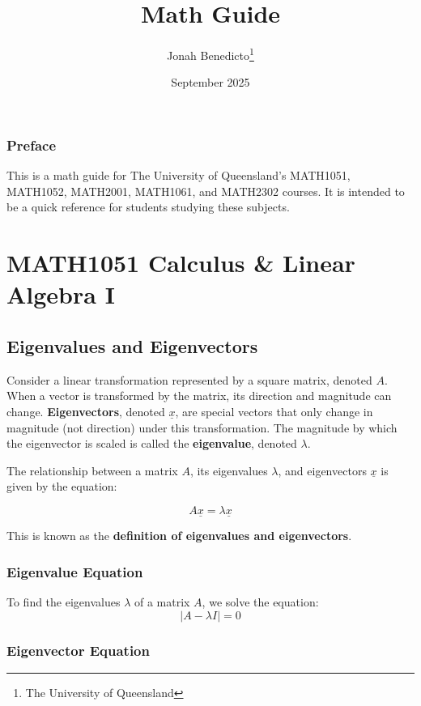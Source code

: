 \documentclass[12pt, letterpaper]{book}
\title{Math Guide}
\author{Jonah Benedicto\thanks{The University of Queensland}}
\date{September 2025}
\begin{document}
\maketitle

\tableofcontents

\newpage

\section*{Preface}
This is a math guide for The University of Queensland's MATH1051, MATH1052, MATH2001, MATH1061, and MATH2302 courses. It is intended to be a quick reference for students studying these subjects.

\part{MATH1051 Calculus \& Linear Algebra I}

\chapter{Eigenvalues and Eigenvectors}

Consider a linear transformation represented by a square matrix, denoted $A$. When a vector is transformed by the matrix, its direction and magnitude can change. \textbf{Eigenvectors}, denoted $\underline{x}$, are special vectors that only change in magnitude (not direction) under this transformation. The magnitude by which the eigenvector is scaled is called the \textbf{eigenvalue}, denoted $\lambda$.

The relationship between a matrix $A$, its eigenvalues $\lambda$, and eigenvectors $\underline{x}$ is given by the equation:

$$A \underline{x} = \lambda \underline{x}$$

This is known as the \textbf{definition of eigenvalues and eigenvectors}.

\section{Eigenvalue Equation}

To find the eigenvalues $\lambda$ of a matrix $A$, we solve the equation:
$$|A - \lambda I| = 0$$

\section{Eigenvector Equation}
\end{document}
